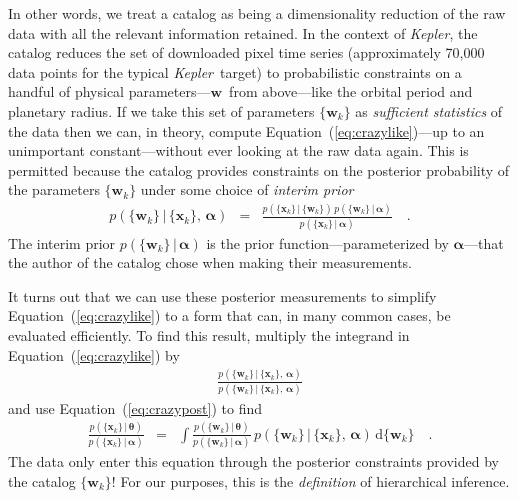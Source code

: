 \documentclass[12pt,preprint]{aastex}
\newcommand{\project}[1]{\emph{#1}}
\newcommand{\kepler}{\project{Kepler}}
\newcommand{\Eq}[1]{Equation~(\ref{eq:#1})}
\newcommand{\eq}[1]{\Eq{#1}}
\newcommand{\eqlabel}[1]{\label{eq:#1}}
\newcommand{\dd}{\ensuremath{\,\mathrm{d}}}
\newcommand{\bvec}[1]{\ensuremath{\boldsymbol{#1}}}
\newcommand{\ratepar}{{\ensuremath{\theta}}}
\newcommand{\ratepars}{{\ensuremath{\bvec{\ratepar}}}}
\newcommand{\data}{{\ensuremath{\bvec{x}}}}
\newcommand{\entry}{{\ensuremath{\bvec{w}}}}
\newcommand{\interim}{{\ensuremath{\bvec{\alpha}}}}
\begin{document}
In other words, we treat a catalog as being a dimensionality reduction of the
raw data with all the relevant information retained.
In the context of \kepler, the catalog reduces the set of downloaded pixel
time series (approximately 70,000 data points for the typical \kepler\ target)
to probabilistic constraints on a handful of physical parameters---\entry\
from above---like the orbital period and planetary radius.
If we take this set of parameters $\{\entry_k\}$ as \emph{sufficient
statistics} of the data then we can, in theory, compute \eq{crazylike}---up to
an unimportant constant---without ever looking at the raw data again.
This is permitted because the catalog provides constraints on the posterior
probability of the parameters $\{\entry_k\}$ under some choice of
\emph{interim prior}
\begin{eqnarray}\eqlabel{crazypost}
p(\{\entry_k\}\,|\,\{\data_k\},\,\interim) &=&
\frac{p(\{\data_k\}\,|\,\{\entry_k\})\,p(\{\entry_k\}\,|\,\interim)}
     {p(\{\data_k\}\,|\,\interim)} \quad.
\end{eqnarray}
The interim prior $p(\{\entry_k\}\,|\,\interim)$ is the prior
function---parameterized by \interim---that the author of the catalog chose
when making their measurements.

It turns out that we can use these posterior measurements to simplify
\eq{crazylike} to a form that can, in many common cases, be evaluated
efficiently.
To find this result, multiply the integrand in \eq{crazylike} by
\begin{eqnarray}
\frac{p(\{\entry_k\}\,|\,\{\data_k\},\,\interim)}
     {p(\{\entry_k\}\,|\,\{\data_k\},\,\interim)}
\end{eqnarray}
and use \eq{crazypost} to find
\begin{eqnarray}\eqlabel{simplemarglike}
\frac{p(\{\data_k\}\,|\,\ratepars)}{p(\{\data_k\}\,|\,\interim)} &=&
    \int
    \frac{p(\{\entry_k\}\,|\,\ratepars)}{p(\{\entry_k\}\,|\,\interim)}\,
    p(\{\entry_k\}\,|\,\{\data_k\},\,\interim)
    \dd\{\entry_k\} \quad.
\end{eqnarray}
The data only enter this equation through the posterior constraints provided
by the catalog $\{\entry_k\}$!
For our purposes, this is the \emph{definition} of hierarchical inference.
\end{document}
